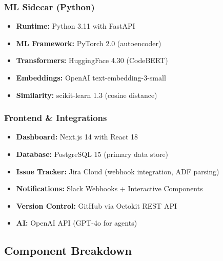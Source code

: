 \documentclass[11pt,a4paper]{article}
\begin{document}
\subsubsection{ML Sidecar (Python)}
\begin{itemize}
    \item \textbf{Runtime:} Python 3.11 with FastAPI
    \item \textbf{ML Framework:} PyTorch 2.0 (autoencoder)
    \item \textbf{Transformers:} HuggingFace 4.30 (CodeBERT)
    \item \textbf{Embeddings:} OpenAI text-embedding-3-small
    \item \textbf{Similarity:} scikit-learn 1.3 (cosine distance)
\end{itemize}

\subsubsection{Frontend \& Integrations}
\begin{itemize}
    \item \textbf{Dashboard:} Next.js 14 with React 18
    \item \textbf{Database:} PostgreSQL 15 (primary data store)
    \item \textbf{Issue Tracker:} Jira Cloud (webhook integration, ADF parsing)
    \item \textbf{Notifications:} Slack Webhooks + Interactive Components
    \item \textbf{Version Control:} GitHub via Octokit REST API
    \item \textbf{AI:} OpenAI API (GPT-4o for agents)
\end{itemize}

\subsection{Component Breakdown}
\end{document}
